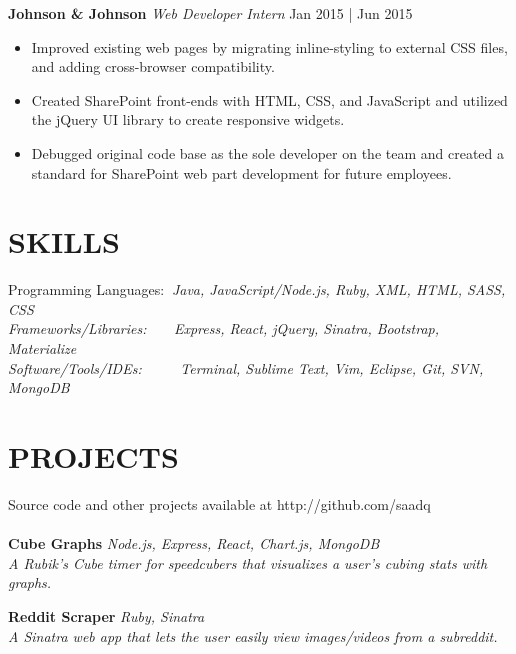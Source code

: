 \documentclass[line,margin]{res}
\begin{document}
\begin{resume}
          {\textbf{Johnson \& Johnson} \sl Web Developer Intern} \hfill Jan 2015 | Jun 2015
          \vspace{1.75mm}
          \begin{itemize} \itemsep 3pt
              \item Improved existing web pages by migrating inline-styling to external CSS files, and adding cross-browser compatibility.
              \item Created SharePoint front-ends with HTML, CSS, and JavaScript and utilized the jQuery UI library to create responsive widgets.
              \item Debugged original code base as the sole developer on the team and created a standard for SharePoint web part development for future employees.
          \end{itemize}

      \section{SKILLS}
          {Programming Languages:} $\:$\sl{Java, JavaScript/Node.js, Ruby, XML, HTML, SASS, CSS} \vspace{1mm}
          {\\ \normalfont Frameworks/Libraries:} $\:$ $\:$$\:$ $\:$\sl{Express, React, jQuery, Sinatra, Bootstrap, Materialize} \vspace{1mm}
          {\\ \normalfont Software/Tools/IDEs:}$\:$ $\:$ $\:$ $\:$ $\:$$\:$\sl{Terminal, Sublime Text, Vim, Eclipse, Git, SVN, MongoDB}

      \section{PROJECTS} Source code and other projects available at http://github.com/saadq \\\\
          \textbf{Cube Graphs} \sl Node.js, Express, React, Chart.js, MongoDB \\
          A Rubik's Cube timer for speedcubers that visualizes a user's cubing stats with graphs. \vspace{-6mm}

          \textbf{Reddit Scraper} \sl Ruby, Sinatra \\
          A Sinatra web app that lets the user easily view images/videos from a subreddit. \vspace{-2mm}


\end{resume}
\end{document}
